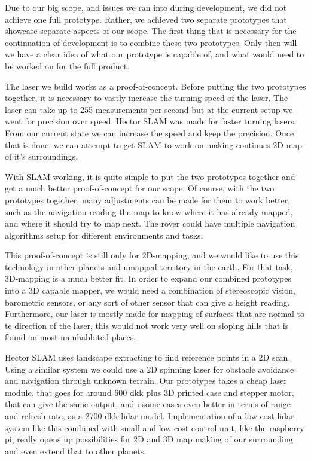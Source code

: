 Due to our big scope, and issues we ran into during development, we did not achieve one full prototype. Rather, we achieved two separate prototypes that showcase separate aspects of our scope. The first thing that is necessary for the continuation of development is to combine these two prototypes. Only then will we have a clear idea of what our prototype is capable of, and what would need to be worked on for the full product.

The laser we build works as a proof-of-concept. Before putting the two prototypes together, it is necessary to vastly increase the turning speed of the laser. The laser can take up to 255 measurements per second but at the current setup we went for precision over speed. Hector SLAM was made for faster turning lasers. From our current state we can increase the speed and keep the precision. Once that is done, we can attempt to get SLAM to work on making continues 2D map of it's surroundings.

With SLAM working, it is quite simple to put the two prototypes together and get a much better proof-of-concept for our scope. Of course, with the two prototypes together, many adjustments can be made for them to work better, such as the navigation reading the map to know where it has already mapped, and where it should try to map next. The rover could have multiple navigation algorithms setup for different environments and tasks. 

This proof-of-concept is still only for 2D-mapping, and we would like to use this technology in other planets and umapped territory in the earth. For that task, 3D-mapping is a much better fit. In order to expand our combined prototypes into a 3D capable mapper, we would need a combination of stereoscopic vision, barometric sensors, or any sort of other sensor that can give a height reading. Furthermore, our laser is mostly made for mapping of surfaces that are normal to te direction of the laser, this would not work very well on sloping hills that is found on most uninhabbited places.

Hector SLAM uses landscape extracting to find reference points in a 2D scan. Using a similar system we could use a 2D spinning laser for obstacle avoidance and navigation through unknown terrain. Our prototypes takes a cheap laser module, that goes for around 600 dkk\cite{lidarl} plus 3D printed case and stepper motor, that can give the same output, and i some cases even better in terms of range and refresh rate, as a 2700 dkk\cite{lidar360} lidar model. Implementation of a low cost lidar system like this combined with small and low cost control unit, like the raspberry pi, really opens up possibilities for 2D and 3D map making of our surrounding and even extend that to other planets. 

